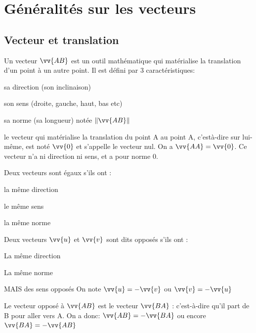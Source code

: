 \documentclass[11pt,a4paper]{article}  %
\begin{document}
\section{Généralités sur les vecteurs}

\subsection{Vecteur et translation}

\begin{bdefi}
	Un vecteur $\vv{AB}$ est un outil mathématique qui matérialise la translation d'un point à un autre point. Il est défini par 3 caractéristiques:
	\begin{itemDef}
		\item sa direction (son inclinaison)
		\item son sens (droite, gauche, haut, bas etc)
		\item sa norme (sa longueur) notée $\| \vv{AB}\|$
	\end{itemDef}
\end{bdefi}

\begin{brmq}
	 le vecteur qui matérialise la translation du point $\mathrm{A}$ au point $\mathrm{A}$, c'està-dire sur lui-même, est noté $\vv{0}$ et s'appelle le vecteur nul. On a $\vv{A A}=\vv{0}$. Ce vecteur n'a ni direction ni sens, et a pour norme $0$.
\end{brmq}
\begin{bdefi}
	 Deux vecteurs sont égaux s'ils ont : 
	\begin{itemDef}
		\item la même direction
		\item le même sens
		\item la même norme 
	\end{itemDef}
\end{bdefi}

\begin{bdefi}
     Deux vecteurs $\vv{u}$ et $\vv{v}$ sont dits opposés s'ils ont :
	\begin{itemDef}
		\item La même direction
		\item La même norme
	\end{itemDef}
	MAIS des sens opposés On note $\vv{u}=-\vv{v}$ ou $\vv{v}=-\vv{u}$
\end{bdefi}
\begin{bprop}
	Le vecteur opposé à $\vv{A B}$ est le vecteur $\vv{B A}$ : c'est-à-dire qu'il part de B pour aller vers A. On a donc:
	$\vv{A B}=-\vv{B A}$ ou encore $\vv{B A}=-\vv{A B}$
\end{bprop}
\end{document}
